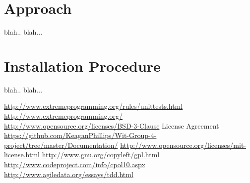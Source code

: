 \documentclass[a4paper,12pt]{article}
\begin{document}
\section{Approach}
blah.. blah...

\section{Installation Procedure}
blah.. blah...


\clearpage
\begin{thebibliography}{5}
 \url{http://www.extremeprogramming.org/rules/unittests.html}
 \url{http://www.extremeprogramming.org/}
 \url{http://www.opensource.org/licenses/BSD-3-Clause}
 License Agreement  \url{https://github.com/KeaganPhillips/Wit-Group-4-project/tree/master/Documentation/}
 \url{http://www.opensource.org/licenses/mit-license.html}
 \url{http://www.gnu.org/copyleft/gpl.html}
 \url{http://www.codeproject.com/info/cpol10.aspx}
 \url{http://www.agiledata.org/essays/tdd.html}

\end{thebibliography}

 
\end{document}
